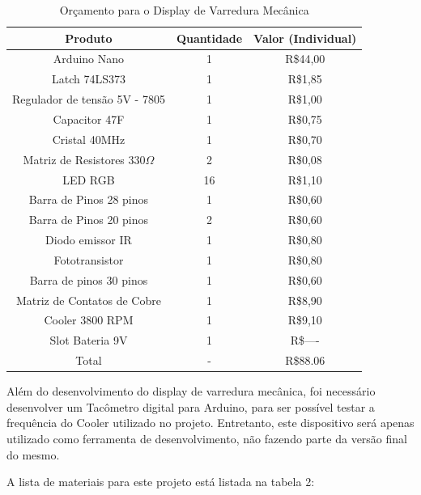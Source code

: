 \begin{table}[!h]
	\centering
	\label{tab:lista-materiais-propeller}
	\begin{tabular}{ccc}
		\hline
		Produto & Quantidade & Valor (Individual) \\
		\hline
		Arduino Nano & 1 & R\$44,00 \\
		Latch 74LS373 & 1 & R\$1,85 \\
	    Regulador de tensão 5V - 7805 & 1 & R\$1,00 \\
		Capacitor 47\simbolo{$\mu$}{micro}F & 1 & R\$0,75 \\
        Cristal 40MHz & 1 & R\$0,70 \\
        Matriz de Resistores 330{$\Omega$} & 2 & R\$0,08 \\
        LED RGB & 16 & R\$1,10 \\
        Barra de Pinos 28 pinos & 1 & R\$0,60 \\
        Barra de Pinos 20 pinos & 2 & R\$0,60 \\
        Diodo emissor IR & 1 & R\$0,80 \\
        Fototransistor & 1 & R\$0,80 \\
        Barra de pinos 30 pinos & 1 & R\$0,60 \\
        Matriz de Contatos de Cobre & 1 & R\$8,90 \\
        Cooler 3800 RPM & 1 & R\$9,10 \\
        Slot Bateria 9V & 1 & R\$---- \\
        Total & - & R\$88.06 \\
		\hline
	\end{tabular}
    \caption[Orçamento para o Display de Varredura Mecânica]{Orçamento para o Display de Varredura Mecânica}
\end{table}


Além do desenvolvimento do display de varredura mecânica, foi necessário desenvolver um Tacômetro digital para Arduino, para ser possível testar a frequência do Cooler utilizado no projeto. Entretanto, este dispositivo será apenas utilizado como ferramenta de desenvolvimento, não fazendo parte da versão final do mesmo.

A lista de materiais para este projeto está listada na tabela 2:

